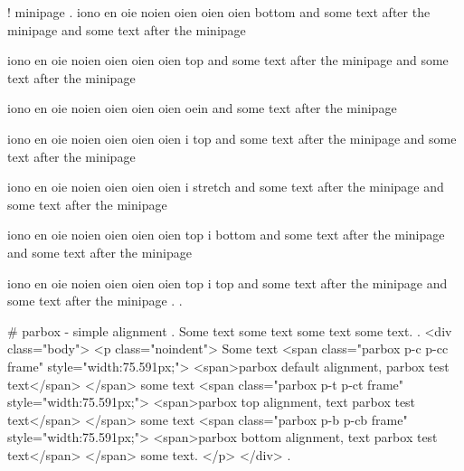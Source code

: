 !
minipage
.
iono en oie noien oien oien oien bottom  and some text after the minipage and some text after the minipage

iono en oie noien oien oien oien top  and some text after the minipage and some text after the minipage


iono en oie noien oien oien oien oein  and some text after the minipage

iono en oie noien oien oien oien i top  and some text after the minipage and some text after the minipage

iono en oie noien oien oien oien i stretch  and some text after the minipage and some text after the minipage

iono en oie noien oien oien oien top i bottom  and some text after the minipage and some text after the minipage

iono en oie noien oien oien oien top i top  and some text after the minipage and some text after the minipage
.
.


#
parbox - simple alignment
.
\noindent
Some text
some text
some text
some text.
.
<div class="body">
<p class="noindent">
Some text <span class="parbox p-c p-cc frame" style="width:75.591px;">
<span>parbox default alignment, parbox test text</span>
</span> some text <span class="parbox p-t p-ct frame" style="width:75.591px;">
<span>parbox top alignment, text parbox test text</span>
</span> some text <span class="parbox p-b p-cb frame" style="width:75.591px;">
<span>parbox bottom alignment, text parbox test text</span>
</span> some text.
</p>
</div>
.


